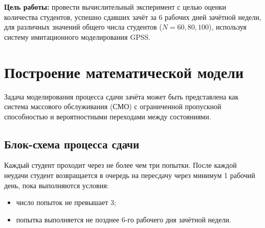 \documentclass[a4paper, 14pt]{extarticle}
\begin{document}
\textbf{Цель работы:} провести вычислительный эксперимент с целью оценки количества студентов, успешно сдавших зачёт за 6 рабочих дней зачётной недели, для различных значений общего числа студентов ($N = 60, 80, 100$), используя систему имитационного моделирования GPSS.

\section{Построение математической модели}
Задача моделирования процесса сдачи зачёта может быть представлена как система массового обслуживания (СМО) с ограниченной пропускной способностью и вероятностными переходами между состояниями.

\subsection{Блок-схема процесса сдачи}
Каждый студент проходит через не более чем три попытки. После каждой неудачи студент возвращается в очередь на пересдачу через минимум 1 рабочий день, пока выполняются условия:
\begin{itemize}
  \item число попыток не превышает 3;
  \item попытка выполняется не позднее 6-го рабочего дня зачётной недели.
\end{itemize}
\end{document}
